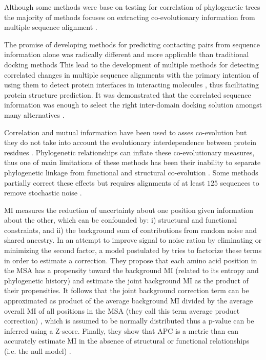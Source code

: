 Although some methods were base on testing for correlation of phylogenetic trees the majority of methods focuses on extracting co-evolutionary information from multiple sequence alignment \cite{rohlfs2010detecting}.

The promise of developing methods for predicting contacting pairs from sequence information alone was radically different and more applicable than traditional docking methods \cite{pazos1997correlated}
This lead to the development of multiple methods for detecting correlated changes in multiple sequence alignments with the primary intention of using them to detect protein interfaces in interacting molecules \cite{pazos1997correlated}, thus facilitating protein structure prediction.
It was demonstrated that the correlated sequence information was enough to select the right inter-domain docking solution amongst many alternatives  \cite{pazos1997correlated}.

Correlation and mutual information have been used to asses co-evolution but they do not take into account the evolutionary interdependence between protein residues \cite{fares2006novel}.
Phylogenetic relationships can inflate these co-evolutionary measures, thus one of main limitations of these methods has been their inability to separate phylogenetic linkage from functional and structural co-evolution \cite{fares2006novel}.
Some methods partially correct these effects but requires alignments of at least $125$ sequences to remove stochastic noise \cite{fares2006novel:REF Gloor et al. (2005)}.

MI measures the reduction of uncertainty about one position given information about the other, which can be confounded by: i) structural and functional constraints, and ii) the background sum of contributions from random noise and shared ancestry.
In an attempt to improve signal to noise ration by eliminating or minimizing the second factor, a model postulated by \cite{dunn2008mutual} tries to factorize these terms in order to estimate a correction.
They propose that each amino acid position in the MSA has a propensity toward the background MI (related to its entropy and phylogenetic history) and estimate the joint background MI as the product of their propensities.
It follows that the joint background correction term can be approximated as product of the average background MI divided by the average overall MI of all positions in the MSA (they call this term average product correction) \cite{dunn2008mutual}, which is assumed to be normally distributed thus a p-value can be inferred using a Z-score.
Finally, they show that APC is a metric than can accurately estimate MI in the absence of structural or functional relationships (i.e. the null model) \cite{dunn2008mutual}.

